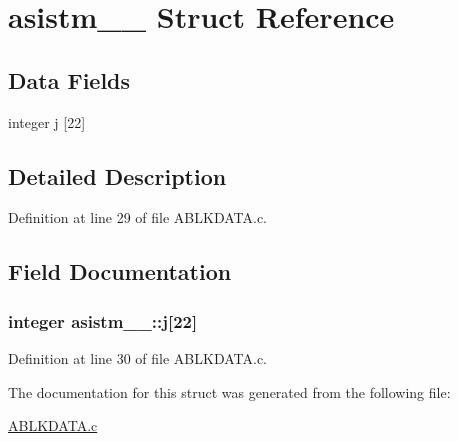 \hypertarget{structasistm__1__}{}\section{asistm\+\_\+\_\+ Struct Reference}
\label{structasistm__1__}
\subsection*{Data Fields}
\begin{DoxyCompactItemize}
\item 
integer \hyperlink{structasistm__1___afdf2cdf648be201f18829c72bc3b0255}{j} \mbox{[}22\mbox{]}
\end{DoxyCompactItemize}


\subsection{Detailed Description}


Definition at line 29 of file A\+B\+L\+K\+D\+A\+T\+A.\+c.



\subsection{Field Documentation}
\subsubsection[{\texorpdfstring{j}{j}}]{\setlength{\rightskip}{0pt plus 5cm}integer asistm\+\_\+\_\+\+::j\mbox{[}22\mbox{]}}\hypertarget{structasistm__1___afdf2cdf648be201f18829c72bc3b0255}{}\label{structasistm__1___afdf2cdf648be201f18829c72bc3b0255}


Definition at line 30 of file A\+B\+L\+K\+D\+A\+T\+A.\+c.



The documentation for this struct was generated from the following file\+:\begin{DoxyCompactItemize}
\item 
\hyperlink{ABLKDATA_8c}{A\+B\+L\+K\+D\+A\+T\+A.\+c}\end{DoxyCompactItemize}
